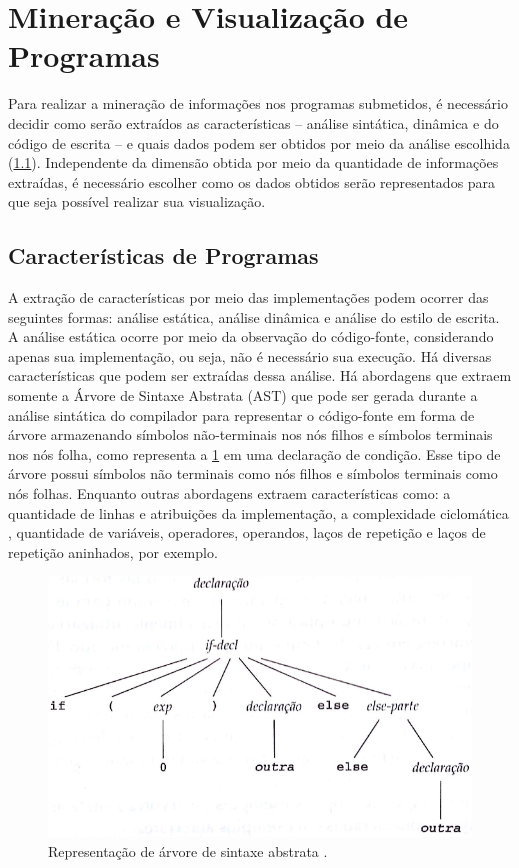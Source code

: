 	\section{Mineração e Visualização de Programas}
	\label{sec:MinVisual}
		Para realizar a mineração de informações nos programas submetidos, é necessário
		decidir como serão extraídos as características -- análise sintática, dinâmica e
		do código de escrita -- e quais dados podem ser obtidos por meio da análise
		escolhida (\cref{subSec:Caracteristicas}). Independente da dimensão
		obtida por meio da quantidade de informações extraídas, é necessário escolher
		como os dados obtidos serão representados para que seja possível realizar sua visualização.
		
		\subsection{Características de Programas}
		\label{subSec:Caracteristicas}

			A extração de características por meio das implementações podem ocorrer das
			seguintes formas: análise estática, análise dinâmica e análise do estilo de escrita.
			A análise estática ocorre por meio da observação do código-fonte, considerando
			apenas sua implementação, ou seja, não é necessário sua execução. Há diversas
			características que podem ser extraídas dessa análise. Há abordagens que extraem
			somente a Árvore de Sintaxe Abstrata (AST) que pode ser gerada durante a análise
			sintática do compilador para representar o código-fonte em forma de árvore
			armazenando símbolos não-terminais nos nós filhos e símbolos terminais nos
			nós folha, como representa a \cref{fig:AST} em uma declaração de condição.
			Esse tipo de árvore possui símbolos não terminais como nós filhos
			e símbolos terminais como nós folhas. Enquanto outras abordagens extraem
			características como: a quantidade de linhas e atribuições da implementação,
			a complexidade ciclomática \cite{mccabe}, quantidade de variáveis, operadores,
			operandos, laços de repetição e laços de repetição aninhados, por exemplo.
						
			\begin{figure}[h]
				\centering
				\includegraphics[width=0.7\linewidth]{imagem/AST}
				\captionsetup{justification=centering}
				\caption{Representação de árvore de sintaxe abstrata \cite{louden2004}.}
				\label{fig:AST}
			\end{figure}
			
